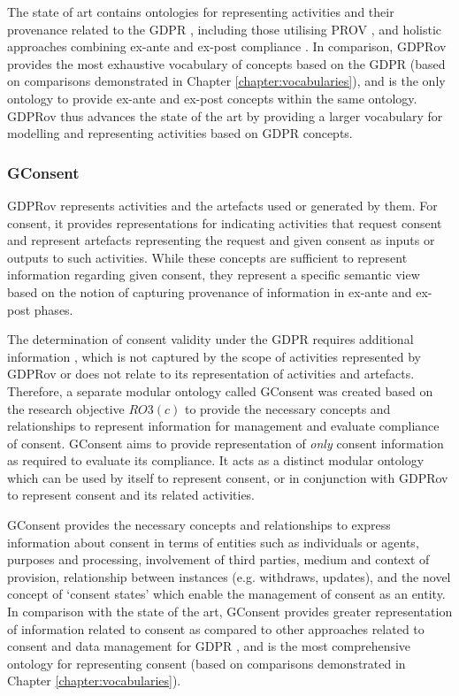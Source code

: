 The state of art contains ontologies for representing activities and their provenance related to the GDPR \cite{pasquier_data_2018,palmirani_pronto:_2018-1}, including those utilising PROV \cite{belhajjame_provenance_2018,bonatti_special_2018-1}, and holistic approaches combining ex-ante and ex-post compliance \cite{dullaert_d3.4_2019}.
In comparison, GDPRov provides the most exhaustive vocabulary of concepts based on the GDPR (based on comparisons demonstrated in Chapter \ref{chapter:vocabularies}), and is the only ontology to provide ex-ante and ex-post concepts within the same ontology.
GDPRov thus advances the state of the art by providing a larger vocabulary for modelling and representing activities based on GDPR concepts.

\subsubsection{GConsent}
GDPRov represents activities and the artefacts used or generated by them.
For consent, it provides representations for indicating activities that request consent and represent artefacts representing the request and given consent as inputs or outputs to such activities.
While these concepts are sufficient to represent information regarding given consent, they represent a specific semantic view based on the notion of capturing provenance of information in ex-ante and ex-post phases.

The determination of consent validity under the GDPR requires additional information \cite{politou_forgetting_2018,article_29_data_protection_working_party_guidelines_2018}, which is not captured by the scope of activities represented by GDPRov or does not relate to its representation of activities and artefacts.
Therefore, a separate modular ontology called GConsent was created based on the research objective $RO3(c)$ to provide the necessary concepts and relationships to represent information for management and evaluate compliance of consent.
GConsent aims to provide representation of \textit{only} consent information as required to evaluate its compliance. It acts as a distinct modular ontology which can be used by itself to represent consent, or in conjunction with GDPRov to represent consent and its related activities.

GConsent provides the necessary concepts and relationships to express information about consent in terms of entities such as individuals or agents, purposes and processing, involvement of third parties, medium and context of provision, relationship between instances (e.g. withdraws, updates), and the novel concept of `consent states' which enable the management of consent as an entity. 
In comparison with the state of the art, GConsent provides greater representation of information related to consent as compared to other approaches related to consent and data management for GDPR \cite{peras_guidelines_2018}, and is the most comprehensive ontology for representing consent (based on comparisons demonstrated in Chapter \ref{chapter:vocabularies}).


